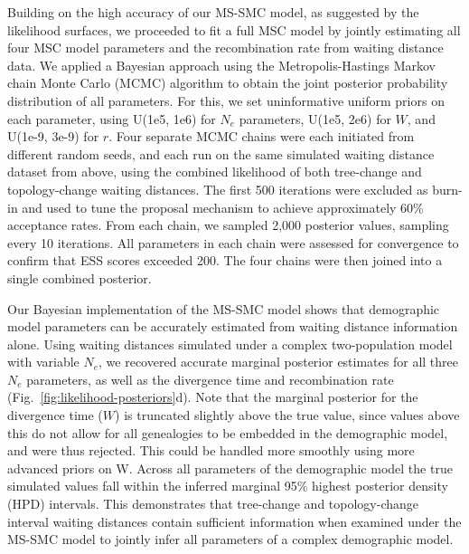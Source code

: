 \documentclass[11pt]{article}
\begin{document}
Building on the high accuracy of our MS-SMC model, as suggested by the likelihood
surfaces, we proceeded to fit a full MSC model by jointly estimating all four MSC
model parameters and the recombination rate from waiting distance data.
We applied a Bayesian approach using the Metropolis-Hastings Markov chain Monte
Carlo (MCMC) algorithm to obtain the joint posterior probability distribution of
all parameters. For this, we set uninformative uniform priors on each parameter,
using U(1e5, 1e6) for $N_e$ parameters, U(1e5, 2e6) for $W$, and U(1e-9, 3e-9) for $r$.
Four separate MCMC chains were each initiated from different random seeds, and 
each run on the same simulated waiting distance dataset from above, using the
combined likelihood of both tree-change and topology-change waiting distances.
The first 500 iterations were excluded as burn-in and used to tune the proposal 
mechanism to achieve approximately 60\% acceptance rates. From each chain, we sampled
2,000 posterior values, sampling every 10 iterations. All parameters in each chain
were assessed for convergence to confirm that ESS scores exceeded 200. The four chains 
were then joined into a single combined posterior.

Our Bayesian implementation of the MS-SMC model shows that demographic model 
parameters can be accurately estimated from waiting distance information alone.
Using waiting distances simulated under a complex two-population model with 
variable $N_e$, we recovered accurate marginal posterior estimates for all three 
$N_e$ parameters, as well as the divergence time and recombination rate 
(Fig.~\ref{fig:likelihood-posteriors}d). 
Note that the marginal posterior for the divergence time ($W$) is truncated 
slightly above the true value, since values above this do not allow for
all genealogies to be embedded in the demographic model, and were thus
rejected. This could be handled more smoothly using more advanced priors on W. 
Across all parameters of the demographic model the true simulated values
fall within the inferred marginal 95\% highest posterior density (HPD) intervals.
This demonstrates that tree-change and topology-change interval waiting 
distances contain sufficient information when examined under the MS-SMC model
to jointly infer all parameters of a complex demographic model.

% 
\end{document}
